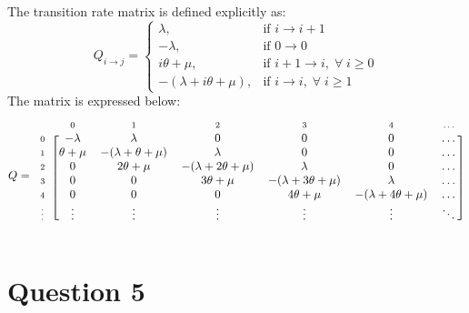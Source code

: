 \documentclass[12pt]{article}
\newcommand{\matindex}[1]{\mbox{\scriptsize#1}}%
\begin{document}
\noindent The transition rate matrix is defined explicitly as: \begin{equation}
    Q_{i \to j} = \begin{cases}
        \lambda, & \text{if } i \to i+1 \\ 
        -\lambda, & \text{if } 0 \to 0 \\ 
        i\theta + \mu, & \text{if } i+1 \to i, \; \forall \; i \geq 0 \\ 
        -(\lambda + i\theta+\mu), & \text{if } i \to i, \; \forall \; i \geq 1 
    \end{cases}
\end{equation} The matrix is expressed below: \begin{equation*}
    Q = \begin{blockarray}{ccccccc}
        & \matindex{0} & \matindex{1} & \matindex{2} & \matindex{3} &\matindex{4} &\matindex{\dots} \\
        \begin{block}{c[cccccc]}
            \matindex{0} & -\lambda & \lambda & 0 & 0 & 0 & \dots \\ 
            \matindex{1} & \theta + \mu & -(\lambda+\theta+\mu) & \lambda & 0 & 0 & \dots \\ 
            \matindex{2} & 0 & 2\theta+\mu & -(\lambda+2\theta+\mu) & \lambda & 0 & \dots \\ 
            \matindex{3} & 0 & 0 & 3\theta+\mu & -(\lambda+3\theta+\mu) & \lambda & \dots \\ 
            \matindex{4} & 0 & 0 & 0 & 4\theta+\mu & -(\lambda+4\theta+\mu) & \dots \\ 
            \matindex{\vdots} & \vdots & \vdots & \vdots & \vdots & \vdots & \ddots \\
        \end{block}
    \end{blockarray}
\end{equation*}

\section*{Question 5}
\end{document}
